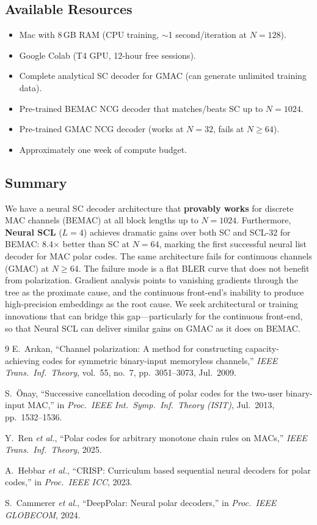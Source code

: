 \documentclass[10pt]{article}
\begin{document}
\subsection{Available Resources}

\begin{itemize}[nosep]
    \item Mac with 8\,GB RAM (CPU training, $\sim$1 second/iteration at $N = 128$).
    \item Google Colab (T4 GPU, 12-hour free sessions).
    \item Complete analytical SC decoder for GMAC (can generate unlimited training data).
    \item Pre-trained BEMAC NCG decoder that matches/beats SC up to $N = 1024$.
    \item Pre-trained GMAC NCG decoder (works at $N = 32$, fails at $N \ge 64$).
    \item Approximately one week of compute budget.
\end{itemize}

\subsection{Summary}

We have a neural SC decoder architecture that \textbf{provably works} for discrete MAC channels (BEMAC) at all block lengths up to $N = 1024$. Furthermore, \textbf{Neural SCL} ($L = 4$) achieves dramatic gains over both SC and SCL-32 for BEMAC: 8.4$\times$ better than SC at $N = 64$, marking the first successful neural list decoder for MAC polar codes. The same architecture fails for continuous channels (GMAC) at $N \ge 64$. The failure mode is a flat BLER curve that does not benefit from polarization. Gradient analysis points to vanishing gradients through the tree as the proximate cause, and the continuous front-end's inability to produce high-precision embeddings as the root cause. We seek architectural or training innovations that can bridge this gap---particularly for the continuous front-end, so that Neural SCL can deliver similar gains on GMAC as it does on BEMAC.

\begin{thebibliography}{9}
E.~Ar{\i}kan, ``Channel polarization: A method for constructing capacity-achieving codes for symmetric binary-input memoryless channels,'' \emph{IEEE Trans.\ Inf.\ Theory}, vol.~55, no.~7, pp.~3051--3073, Jul.~2009.

S.~\"Onay, ``Successive cancellation decoding of polar codes for the two-user binary-input MAC,'' in \emph{Proc.\ IEEE Int.\ Symp.\ Inf.\ Theory (ISIT)}, Jul.~2013, pp.~1532--1536.

Y.~Ren \emph{et al.}, ``Polar codes for arbitrary monotone chain rules on MACs,'' \emph{IEEE Trans.\ Inf.\ Theory}, 2025.

A.~Hebbar \emph{et al.}, ``CRISP: Curriculum based sequential neural decoders for polar codes,'' in \emph{Proc.\ IEEE ICC}, 2023.

S.~Cammerer \emph{et al.}, ``DeepPolar: Neural polar decoders,'' in \emph{Proc.\ IEEE GLOBECOM}, 2024.
\end{thebibliography}
\end{document}
